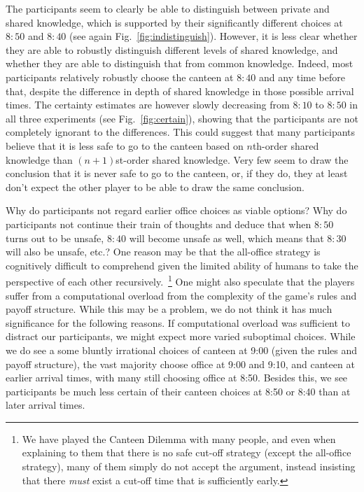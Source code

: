 \documentclass[twocolumn,a4paper,superscriptaddress,nofootinbib]{revtex4}
\newcommand{\add}[1]{{\color{green2} Add: #1}}
\begin{document}
The participants seem to clearly be able to distinguish between private and shared knowledge, which is supported by their significantly different choices at $8{:}50$ and $8{:}40$ (see again Fig.~\ref{fig:indistinguish}). However, it is less clear whether they are able to robustly distinguish different levels of shared knowledge, and whether they are able to distinguish that from common knowledge. Indeed, most participants relatively robustly choose the canteen at $8{:}40$ and any time before that, despite the difference in depth of shared knowledge in those possible arrival times. The certainty estimates are however slowly decreasing from $8{:}10$ to $8{:}50$ in all three experiments (see Fig.~\ref{fig:certain}), showing that the participants are not completely ignorant to the differences. This could suggest that many participants believe that it is less safe to go to the canteen based on $n$th-order shared knowledge than $(n+1)$st-order shared knowledge. Very few seem to draw the conclusion that it is never safe to go to the canteen, or, if they do, they at least don't expect the other player to be able to draw the same conclusion. 

Why do participants not regard earlier office choices as viable options? Why do participants not continue their train of thoughts and deduce that when $8{:}50$ turns out to be unsafe, $8{:}40$ will become unsafe as well, which means that $8{:}30$ will also be unsafe, etc.? One reason may be that the all-office strategy is cognitively difficult to comprehend given the  limited  ability of humans to take the perspective of each other recursively.~\footnote{We have played the Canteen Dilemma with many people, and even when explaining to them that there is no safe cut-off strategy (except the all-office strategy), many of them simply do not accept the argument, instead insisting that there \emph{must} exist a cut-off time that is sufficiently early.} 
One might also speculate that the players suffer from a 
computational overload from the complexity of the game's rules and payoff structure. While this may be a problem, we do not think it has much significance for the following reasons. If computational overload was sufficient to distract our participants, we might expect more varied suboptimal choices. While we do see a some bluntly irrational choices of canteen at 9:00 (given the rules and payoff structure), the vast majority choose office at 9:00 and 9:10, and canteen at earlier arrival times, with many still choosing office at 8:50. Besides this, we see participants be much less certain of their canteen choices at 8:50 or 8:40 than at later arrival times. 
\end{document}
